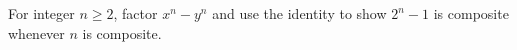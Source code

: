 For integer $n\ge2$, factor $x^n-y^n$ and use the identity to show $2^n-1$ is composite whenever $n$ is composite.
